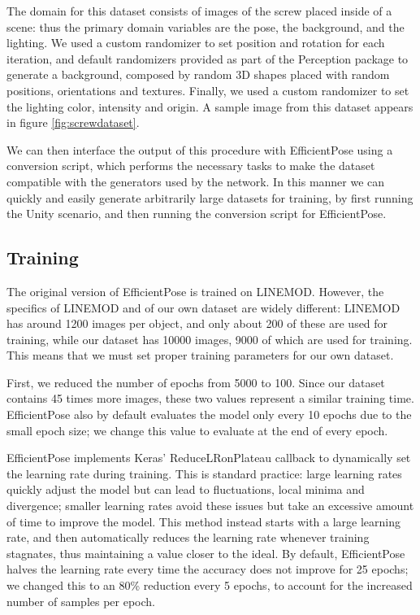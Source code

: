 The domain for this dataset consists of images of the screw placed inside of a scene: thus the primary domain variables are the pose, the background, and the lighting. We used a custom randomizer to set position and rotation for each iteration, and default randomizers provided as part of the Perception package to generate a background, composed by random 3D shapes placed with random positions, orientations and textures. Finally, we used a custom randomizer to set the lighting color, intensity and origin. A sample image from this dataset appears in figure \ref{fig:screwdataset}.

We can then interface the output of this procedure with EfficientPose using a conversion script, which performs the necessary tasks to make the dataset compatible with the generators used by the network. In this manner we can quickly and easily generate arbitrarily large datasets for training, by first running the Unity scenario, and then running the conversion script for EfficientPose.

\subsection{Training}

The original version of EfficientPose is trained on LINEMOD. However, the specifics of LINEMOD and of our own dataset are widely different: LINEMOD has around 1200 images per object, and only about 200 of these are used for training, while our dataset has 10000 images, 9000 of which are used for training. This means that we must set proper training parameters for our own dataset.

First, we reduced the number of epochs from 5000 to 100. Since our dataset contains 45 times more images, these two values represent a similar training time. EfficientPose also by default evaluates the model only every 10 epochs due to the small epoch size; we change this value to evaluate at the end of every epoch.

EfficientPose implements Keras' ReduceLRonPlateau callback to dynamically set the learning rate during training. This is standard practice: large learning rates quickly adjust the model but can lead to fluctuations, local minima and divergence; smaller learning rates avoid these issues but take an excessive amount of time to improve the model\cite{ReduceLR}. This method instead starts with a large learning rate, and then automatically reduces the learning rate whenever training stagnates, thus maintaining a value closer to the ideal. By default, EfficientPose halves the learning rate every time the accuracy does not improve for 25 epochs; we changed this to an 80\% reduction every 5 epochs, to account for the increased number of samples per epoch.


